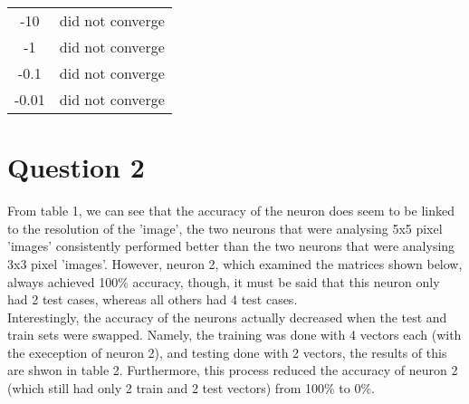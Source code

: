 \documentclass{article}
\begin{document}
\begin{table}[]
\begin{tabular}{c|cccc}
-10                            & \multicolumn{4}{c}{did not converge}                                                                                                                                                                                                                                                                                                                                                             \\
-1                             & \multicolumn{4}{c}{did not converge}                                                                                                                                                                                                                                                                                                                                                             \\
-0.1                           & \multicolumn{4}{c}{did not converge}                                                                                                                                                                                                                                                                                                                                                             \\
-0.01                          & \multicolumn{4}{c}{did not converge}                                                                                                                                                                                                                                                                                                                                                            
\end{tabular}
\end{table}

\section{Question 2}
From table 1, we can see that the accuracy of the neuron does seem to be linked to the resolution of the 'image', the two neurons that were analysing 5x5 pixel 'images' consistently performed better than the two neurons that were analysing 3x3 pixel 'images'. However, neuron 2, which examined the matrices shown below, always achieved 100\% accuracy, though, it must be said that this neuron only had 2 test cases, whereas all others had 4 test cases.\\ Interestingly, the accuracy of the neurons actually decreased when the test and train sets were swapped. Namely, the training was done with 4 vectors each (with the exeception of neuron 2), and testing done with 2 vectors, the results of this are shwon in table 2. Furthermore, this process reduced the accuracy of neuron 2 (which still had only 2 train and 2 test vectors) from 100\% to 0\%. 
\end{document}
